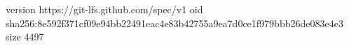 version https://git-lfs.github.com/spec/v1
oid sha256:8e592f371cf09e94bb22491eac4e83b42755a9ea7d0ce1f979bbb26de083e4e3
size 4497
